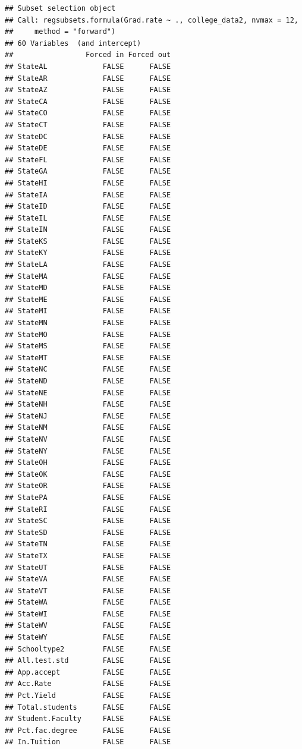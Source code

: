 \documentclass[]{article}
\begin{document}
\begin{verbatim}
## Subset selection object
## Call: regsubsets.formula(Grad.rate ~ ., college_data2, nvmax = 12, 
##     method = "forward")
## 60 Variables  (and intercept)
##                 Forced in Forced out
## StateAL             FALSE      FALSE
## StateAR             FALSE      FALSE
## StateAZ             FALSE      FALSE
## StateCA             FALSE      FALSE
## StateCO             FALSE      FALSE
## StateCT             FALSE      FALSE
## StateDC             FALSE      FALSE
## StateDE             FALSE      FALSE
## StateFL             FALSE      FALSE
## StateGA             FALSE      FALSE
## StateHI             FALSE      FALSE
## StateIA             FALSE      FALSE
## StateID             FALSE      FALSE
## StateIL             FALSE      FALSE
## StateIN             FALSE      FALSE
## StateKS             FALSE      FALSE
## StateKY             FALSE      FALSE
## StateLA             FALSE      FALSE
## StateMA             FALSE      FALSE
## StateMD             FALSE      FALSE
## StateME             FALSE      FALSE
## StateMI             FALSE      FALSE
## StateMN             FALSE      FALSE
## StateMO             FALSE      FALSE
## StateMS             FALSE      FALSE
## StateMT             FALSE      FALSE
## StateNC             FALSE      FALSE
## StateND             FALSE      FALSE
## StateNE             FALSE      FALSE
## StateNH             FALSE      FALSE
## StateNJ             FALSE      FALSE
## StateNM             FALSE      FALSE
## StateNV             FALSE      FALSE
## StateNY             FALSE      FALSE
## StateOH             FALSE      FALSE
## StateOK             FALSE      FALSE
## StateOR             FALSE      FALSE
## StatePA             FALSE      FALSE
## StateRI             FALSE      FALSE
## StateSC             FALSE      FALSE
## StateSD             FALSE      FALSE
## StateTN             FALSE      FALSE
## StateTX             FALSE      FALSE
## StateUT             FALSE      FALSE
## StateVA             FALSE      FALSE
## StateVT             FALSE      FALSE
## StateWA             FALSE      FALSE
## StateWI             FALSE      FALSE
## StateWV             FALSE      FALSE
## StateWY             FALSE      FALSE
## Schooltype2         FALSE      FALSE
## All.test.std        FALSE      FALSE
## App.accept          FALSE      FALSE
## Acc.Rate            FALSE      FALSE
## Pct.Yield           FALSE      FALSE
## Total.students      FALSE      FALSE
## Student.Faculty     FALSE      FALSE
## Pct.fac.degree      FALSE      FALSE
## In.Tuition          FALSE      FALSE

\end{verbatim}
\end{document}
